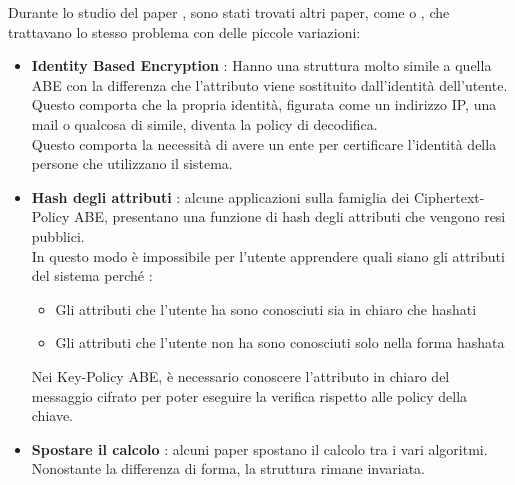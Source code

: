 Durante lo studio del paper \cite{kpabe}, sono stati trovati altri paper, come \cite{sssth} o \cite{benoit}, che trattavano lo stesso problema con delle piccole variazioni:
\begin{itemize}
	\item \textbf{Identity Based Encryption} : Hanno una struttura molto simile a quella ABE con la differenza che l'attributo viene sostituito dall'identità dell'utente. Questo comporta che la propria identità, figurata come un indirizzo IP, una mail o qualcosa di simile, diventa la policy di decodifica.\\
	Questo comporta la necessità di avere un ente per certificare l'identità della persone che utilizzano il sistema.
	\item \textbf{Hash degli attributi} : alcune applicazioni \cite{kpabe2} sulla famiglia dei Ciphertext-Policy ABE, presentano una funzione di hash degli attributi che vengono resi pubblici.\\  In questo modo è impossibile per l'utente apprendere quali siano gli attributi del sistema perché :
	\begin{itemize}
		\item Gli attributi che l'utente ha sono conosciuti sia in chiaro che hashati
		\item Gli attributi che l'utente non ha sono conosciuti solo nella forma hashata
	\end{itemize}
	Nei Key-Policy ABE, è necessario conoscere l'attributo in chiaro del messaggio cifrato per poter eseguire la verifica rispetto alle policy della chiave.
	\item \textbf{Spostare il calcolo} : alcuni paper spostano il calcolo tra i vari algoritmi. Nonostante la differenza di forma, la struttura rimane invariata.
\end{itemize}